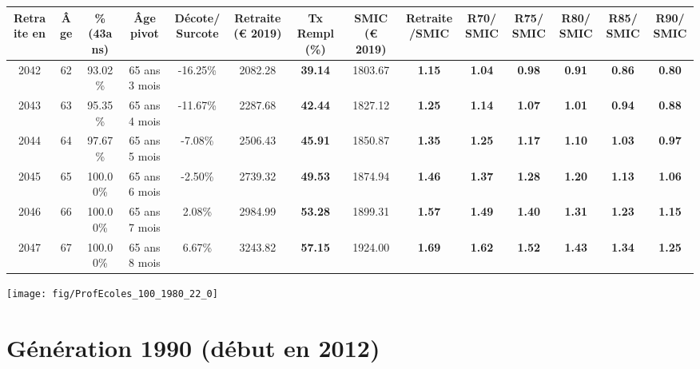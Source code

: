 \begin{adjustbox}{max width=\textwidth} 
\begin{tabular}[htb]{|c|c||c|c|c||c|c||c|c||c|c|c|c|c|} 
\hline 
 Retraite en &  Âge &  \%(43ans) &  Âge pivot &  Décote/Surcote &  Retraite (\euro{} 2019) &  Tx Rempl(\%) &  SMIC (\euro{} 2019) &  Retraite/SMIC &  R70/SMIC &  R75/SMIC &  R80/SMIC &  R85/SMIC &  R90/SMIC \\ 
\hline \hline 
 2042 &  62 &  93.02\% &  65 ans 3 mois &  -16.25\% &  2082.28 &  {\bf 39.14} &  1803.67 &  {\bf 1.15} &  {\bf 1.04} &  {\bf {\color{red} 0.98}} &  {\bf {\color{red} 0.91}} &  {\bf {\color{red} 0.86}} &  {\bf {\color{red} 0.80}} \\ 
\hline 
 2043 &  63 &  95.35\% &  65 ans 4 mois &  -11.67\% &  2287.68 &  {\bf 42.44} &  1827.12 &  {\bf 1.25} &  {\bf 1.14} &  {\bf 1.07} &  {\bf 1.01} &  {\bf {\color{red} 0.94}} &  {\bf {\color{red} 0.88}} \\ 
\hline 
 2044 &  64 &  97.67\% &  65 ans 5 mois &  -7.08\% &  2506.43 &  {\bf 45.91} &  1850.87 &  {\bf 1.35} &  {\bf 1.25} &  {\bf 1.17} &  {\bf 1.10} &  {\bf 1.03} &  {\bf {\color{red} 0.97}} \\ 
\hline 
 2045 &  65 &  100.00\% &  65 ans 6 mois &  -2.50\% &  2739.32 &  {\bf 49.53} &  1874.94 &  {\bf 1.46} &  {\bf 1.37} &  {\bf 1.28} &  {\bf 1.20} &  {\bf 1.13} &  {\bf 1.06} \\ 
\hline 
 2046 &  66 &  100.00\% &  65 ans 7 mois &  2.08\% &  2984.99 &  {\bf 53.28} &  1899.31 &  {\bf 1.57} &  {\bf 1.49} &  {\bf 1.40} &  {\bf 1.31} &  {\bf 1.23} &  {\bf 1.15} \\ 
\hline 
 2047 &  67 &  100.00\% &  65 ans 8 mois &  6.67\% &  3243.82 &  {\bf 57.15} &  1924.00 &  {\bf 1.69} &  {\bf 1.62} &  {\bf 1.52} &  {\bf 1.43} &  {\bf 1.34} &  {\bf 1.25} \\ 
\hline 
\hline 
\end{tabular} 
\end{adjustbox} 
 
 \vspace{0.1cm} 

 {\hspace{-2.2cm}\texttt{[image: fig/ProfEcoles\_100\_1980\_22\_0]}} 

\newpage 
 
\section{Génération 1990 (début en 2012)\label{ProfEcoles_100_1990_22_0}} 
 
